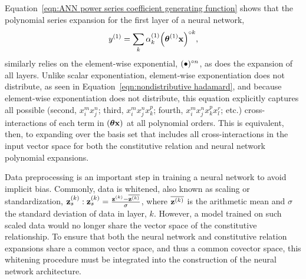 Equation~\ref{eqn:ANN power series coefficient generating function} shows that the polynomial series expansion for the first layer of a neural network,
\[
    y^{(1)} = \sum_k \alpha^{(1)}_k \he[\left( \boldsymbol{\theta}^{(1)} {\bf x} \right)]{k},
\]
similarly relies on the element-wise exponential, $(\bullet)\he{n}$, as does the expansion of all layers. Unlike scalar exponentiation, element-wise exponentiation does not distribute, as seen in Equation~\ref{eqn:nondistributive hadamard}, and because element-wise exponentiation does not distribute, this equation explicitly captures all possible (second, $x_i^m x_j^n$; third, $x_i^m x_j^n x_k^p$; fourth, $x_i^m x_j^n x_k^p x_l^r$; etc.) cross-interactions of each term in $(\boldsymbol{\theta}{\bf x})$ at all polynomial orders. This is equivalent, then, to expanding over the basis set that includes all cross-interactions in the input vector space for both the constitutive relation and neural network polynomial expansions.

Data preprocessing is an important step in training a neural network to avoid implicit bias. Commonly, data is whitened, also known as scaling or standardization, ${\bf z}_s^{(k)}: {\bf z}_s^{(k)} = \frac{{\bf z}^{(k)} - \overline{{\bf z}^{(k)}}}{\sigma}$, where $\overline{{\bf z}^{(k)}}$ is the arithmetic mean and $\sigma$ the standard deviation of data in layer, $k$. However, a model trained on such scaled data would no longer share the vector space of the constitutive relationship. To ensure that both the neural network and constitutive relation expansions share a common vector space, and thus a common covector space, this whitening procedure must be integrated into the construction of the neural network architecture.

